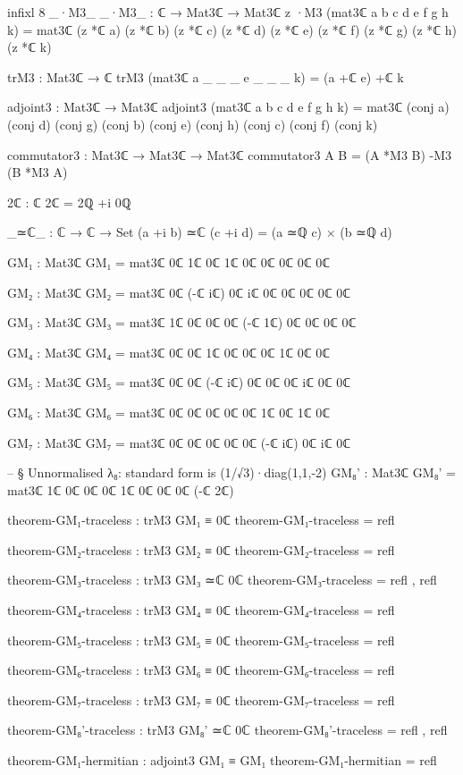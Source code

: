\documentclass[11pt,a4paper]{book}
\begin{document}
\begin{code}
infixl 8 _·M3_
_·M3_ : ℂ → Mat3ℂ → Mat3ℂ
z ·M3 (mat3ℂ a b c d e f g h k) =
  mat3ℂ (z *ℂ a) (z *ℂ b) (z *ℂ c) (z *ℂ d) (z *ℂ e) (z *ℂ f)
         (z *ℂ g) (z *ℂ h) (z *ℂ k)

trM3 : Mat3ℂ → ℂ
trM3 (mat3ℂ a _ _ _ e _ _ _ k) = (a +ℂ e) +ℂ k

adjoint3 : Mat3ℂ → Mat3ℂ
adjoint3 (mat3ℂ a b c d e f g h k) =
  mat3ℂ (conj a) (conj d) (conj g)
         (conj b) (conj e) (conj h)
         (conj c) (conj f) (conj k)

commutator3 : Mat3ℂ → Mat3ℂ → Mat3ℂ
commutator3 A B = (A *M3 B) -M3 (B *M3 A)

2ℂ : ℂ
2ℂ = 2ℚ +i 0ℚ

_≃ℂ_ : ℂ → ℂ → Set
(a +i b) ≃ℂ (c +i d) = (a ≃ℚ c) × (b ≃ℚ d)

GM₁ : Mat3ℂ
GM₁ = mat3ℂ 0ℂ 1ℂ 0ℂ  1ℂ 0ℂ 0ℂ  0ℂ 0ℂ 0ℂ

GM₂ : Mat3ℂ
GM₂ = mat3ℂ 0ℂ (-ℂ iℂ) 0ℂ  iℂ 0ℂ 0ℂ  0ℂ 0ℂ 0ℂ

GM₃ : Mat3ℂ
GM₃ = mat3ℂ 1ℂ 0ℂ 0ℂ  0ℂ (-ℂ 1ℂ) 0ℂ  0ℂ 0ℂ 0ℂ

GM₄ : Mat3ℂ
GM₄ = mat3ℂ 0ℂ 0ℂ 1ℂ  0ℂ 0ℂ 0ℂ  1ℂ 0ℂ 0ℂ

GM₅ : Mat3ℂ
GM₅ = mat3ℂ 0ℂ 0ℂ (-ℂ iℂ)  0ℂ 0ℂ 0ℂ  iℂ 0ℂ 0ℂ

GM₆ : Mat3ℂ
GM₆ = mat3ℂ 0ℂ 0ℂ 0ℂ  0ℂ 0ℂ 1ℂ  0ℂ 1ℂ 0ℂ

GM₇ : Mat3ℂ
GM₇ = mat3ℂ 0ℂ 0ℂ 0ℂ  0ℂ 0ℂ (-ℂ iℂ)  0ℂ iℂ 0ℂ

-- § Unnormalised λ₈: standard form is (1/√3)·diag(1,1,-2)
GM₈' : Mat3ℂ
GM₈' = mat3ℂ 1ℂ 0ℂ 0ℂ  0ℂ 1ℂ 0ℂ  0ℂ 0ℂ (-ℂ 2ℂ)

theorem-GM₁-traceless : trM3 GM₁ ≡ 0ℂ
theorem-GM₁-traceless = refl

theorem-GM₂-traceless : trM3 GM₂ ≡ 0ℂ
theorem-GM₂-traceless = refl

theorem-GM₃-traceless : trM3 GM₃ ≃ℂ 0ℂ
theorem-GM₃-traceless = refl , refl

theorem-GM₄-traceless : trM3 GM₄ ≡ 0ℂ
theorem-GM₄-traceless = refl

theorem-GM₅-traceless : trM3 GM₅ ≡ 0ℂ
theorem-GM₅-traceless = refl

theorem-GM₆-traceless : trM3 GM₆ ≡ 0ℂ
theorem-GM₆-traceless = refl

theorem-GM₇-traceless : trM3 GM₇ ≡ 0ℂ
theorem-GM₇-traceless = refl

theorem-GM₈'-traceless : trM3 GM₈' ≃ℂ 0ℂ
theorem-GM₈'-traceless = refl , refl

theorem-GM₁-hermitian : adjoint3 GM₁ ≡ GM₁
theorem-GM₁-hermitian = refl


\end{code}
\end{document}
